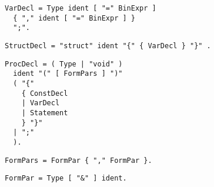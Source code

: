 
\begin{samepage}
\begin{lstlisting}[language=EBNF]
VarDecl = Type ident [ "=" BinExpr ]
  { "," ident [ "=" BinExpr ] }
  ";".
\end{lstlisting}
\end{samepage}


\begin{samepage}
\begin{lstlisting}[language=EBNF]
StructDecl = "struct" ident "{" { VarDecl } "}" .
\end{lstlisting}
\end{samepage}


\begin{samepage}
\begin{lstlisting}[language=EBNF]
ProcDecl = ( Type | "void" )
  ident "(" [ FormPars ] ")"
  ( "{" 
    { ConstDecl 
    | VarDecl 
    | Statement 
    } "}" 
  | ";"
  ).
\end{lstlisting}
\end{samepage}


\begin{samepage}
\begin{lstlisting}[language=EBNF]
FormPars = FormPar { "," FormPar }.
\end{lstlisting}
\end{samepage}


\begin{samepage}
\begin{lstlisting}[language=EBNF]
FormPar = Type [ "&" ] ident.
\end{lstlisting}
\end{samepage}

